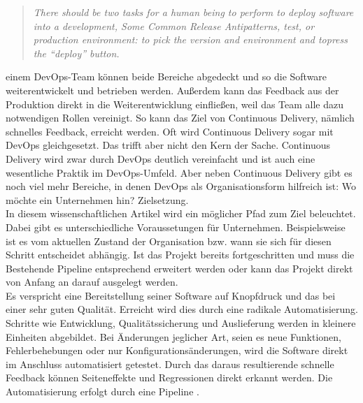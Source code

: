 \begin{quote} \textit{\glqq There should be two tasks for a human being to perform to deploy software into a development, Some Common Release Antipatterns, test, or production environment: to pick the version and environment and topress the “deploy” button. \grqq~}\cite[S.5]{Farley.2011}\\ \end{quote} 



 einem DevOps-Team können beide Bereiche abgedeckt und so die Software weiterentwickelt und betrieben werden. Außerdem kann das Feedback aus der Produktion direkt in die Weiterentwicklung einfließen, weil das Team alle dazu notwendigen Rollen vereinigt. So kann das Ziel von Continuous Delivery, nämlich schnelles Feedback, erreicht werden. Oft wird Continuous Delivery sogar mit DevOps gleichgesetzt. Das trifft aber nicht den Kern der Sache. Continuous Delivery wird zwar durch DevOps deutlich vereinfacht und ist auch eine wesentliche Praktik im DevOps-Umfeld. Aber neben Continuous Delivery gibt es noch viel mehr Bereiche, in denen DevOps als Organisationsform hilfreich ist: Wo möchte ein Unternehmen hin? Zielsetzung. \\In diesem wissenschaftlichen Artikel wird ein möglicher Pfad zum Ziel beleuchtet. Dabei gibt es unterschiedliche Voraussetungen für Unternehmen. Beispielsweise ist es vom aktuellen Zustand der Organisation bzw. wann sie sich für diesen Schritt entscheidet abhängig. Ist das Projekt bereits fortgeschritten und muss die Bestehende Pipeline entsprechend erweitert werden oder kann das Projekt direkt von Anfang an darauf ausgelegt werden.\\
Es verspricht eine Bereitstellung seiner Software auf Knopfdruck und das bei einer sehr guten Qualität. Erreicht wird dies durch eine radikale Automatisierung. Schritte wie Entwicklung, Qualitätssicherung und Auslieferung werden in kleinere Einheiten abgebildet. Bei Änderungen jeglicher Art, seien es neue Funktionen, Fehlerbehebungen oder nur Konfigurationsänderungen, wird die Software direkt im Anschluss automatisiert getestet. Durch das daraus resultierende schnelle Feedback können Seiteneffekte und Regressionen direkt erkannt werden. Die Automatisierung erfolgt durch eine Pipeline \cite{Birk.2014}. 

